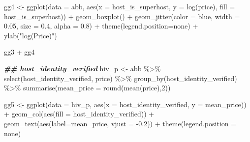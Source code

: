 \documentclass[
]{article}
\newenvironment{Shaded}{\begin{snugshade}}{\end{snugshade}}
\newcommand{\AttributeTok}[1]{\textcolor[rgb]{0.77,0.63,0.00}{#1}}
\newcommand{\DecValTok}[1]{\textcolor[rgb]{0.00,0.00,0.81}{#1}}
\newcommand{\DocumentationTok}[1]{\textcolor[rgb]{0.56,0.35,0.01}{\textbf{\textit{#1}}}}
\newcommand{\FloatTok}[1]{\textcolor[rgb]{0.00,0.00,0.81}{#1}}
\newcommand{\FunctionTok}[1]{\textcolor[rgb]{0.00,0.00,0.00}{#1}}
\newcommand{\NormalTok}[1]{#1}
\newcommand{\OtherTok}[1]{\textcolor[rgb]{0.56,0.35,0.01}{#1}}
\newcommand{\SpecialCharTok}[1]{\textcolor[rgb]{0.00,0.00,0.00}{#1}}
\newcommand{\StringTok}[1]{\textcolor[rgb]{0.31,0.60,0.02}{#1}}
\begin{document}
\begin{Shaded}
\begin{Highlighting}[]
\NormalTok{gg4 }\OtherTok{\textless{}{-}} \FunctionTok{ggplot}\NormalTok{(}\AttributeTok{data =}\NormalTok{ abb, }\FunctionTok{aes}\NormalTok{(}\AttributeTok{x =}\NormalTok{ host\_is\_superhost, }
                              \AttributeTok{y =} \FunctionTok{log}\NormalTok{(price), }
                              \AttributeTok{fill =}\NormalTok{ host\_is\_superhost)) }\SpecialCharTok{+} 
            \FunctionTok{geom\_boxplot}\NormalTok{() }\SpecialCharTok{+} 
            \FunctionTok{geom\_jitter}\NormalTok{(}\AttributeTok{color =} \StringTok{\textquotesingle{}blue\textquotesingle{}}\NormalTok{, }\AttributeTok{width =} \FloatTok{0.05}\NormalTok{, }\AttributeTok{size =} \FloatTok{0.4}\NormalTok{, }\AttributeTok{alpha =} \FloatTok{0.8}\NormalTok{) }\SpecialCharTok{+}
            \FunctionTok{theme}\NormalTok{(}\AttributeTok{legend.position=}\StringTok{\textquotesingle{}none\textquotesingle{}}\NormalTok{) }\SpecialCharTok{+}
            \FunctionTok{ylab}\NormalTok{(}\StringTok{"log(Price)"}\NormalTok{)}

\NormalTok{gg3 }\SpecialCharTok{+}\NormalTok{ gg4}


\DocumentationTok{\#\# host\_identity\_verified}
\NormalTok{hiv\_p }\OtherTok{\textless{}{-}}\NormalTok{ abb }\SpecialCharTok{\%\textgreater{}\%} \FunctionTok{select}\NormalTok{(host\_identity\_verified, price) }\SpecialCharTok{\%\textgreater{}\%} \FunctionTok{group\_by}\NormalTok{(host\_identity\_verified) }\SpecialCharTok{\%\textgreater{}\%} \FunctionTok{summarise}\NormalTok{(}\AttributeTok{mean\_price =} \FunctionTok{round}\NormalTok{(}\FunctionTok{mean}\NormalTok{(price),}\DecValTok{2}\NormalTok{))}

\NormalTok{gg5 }\OtherTok{\textless{}{-}} \FunctionTok{ggplot}\NormalTok{(}\AttributeTok{data =}\NormalTok{ hiv\_p, }\FunctionTok{aes}\NormalTok{(}\AttributeTok{x =}\NormalTok{ host\_identity\_verified, }\AttributeTok{y =}\NormalTok{ mean\_price)) }\SpecialCharTok{+}
          \FunctionTok{geom\_col}\NormalTok{(}\FunctionTok{aes}\NormalTok{(}\AttributeTok{fill =}\NormalTok{ host\_identity\_verified)) }\SpecialCharTok{+}
          \FunctionTok{geom\_text}\NormalTok{(}\FunctionTok{aes}\NormalTok{(}\AttributeTok{label=}\NormalTok{mean\_price, }\AttributeTok{vjust =} \SpecialCharTok{{-}}\FloatTok{0.2}\NormalTok{)) }\SpecialCharTok{+}
          \FunctionTok{theme}\NormalTok{(}\AttributeTok{legend.position =} \StringTok{\textquotesingle{}none\textquotesingle{}}\NormalTok{)}


\end{Highlighting}
\end{Shaded}
\end{document}
